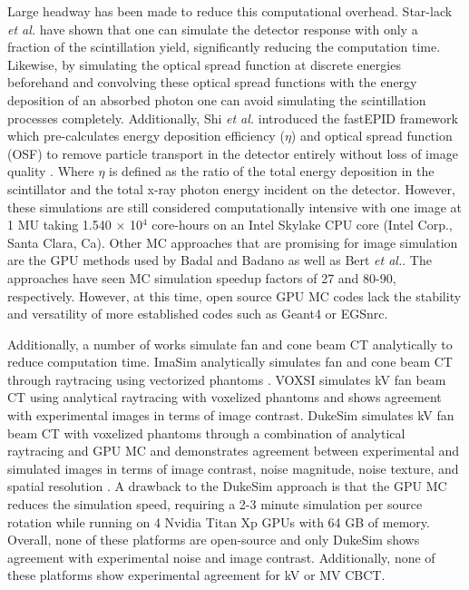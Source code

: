 Large headway has been made to reduce this computational overhead. Star-lack \textit{et al.}  have shown that one can simulate the detector response with only a fraction of the scintillation yield, significantly reducing the computation time\cite{Star-Lack2014RapidDQEf}. Likewise, by simulating the optical spread function at discrete energies beforehand and convolving these optical spread functions with the energy deposition of an absorbed photon one can avoid simulating the scintillation processes completely\cite{Kausch1999MonteRadiotherapy, Kirkby2005ComprehensiveEPID}. Additionally, Shi \textit{et al.} introduced the fastEPID framework which pre-calculates energy deposition efficiency ($\eta$) and optical spread function (OSF) to remove particle transport in the detector entirely without loss of image quality \cite{Shi2019ADetectors.}. Where $\eta$ is defined as the ratio of the total energy deposition in the scintillator and the total x-ray photon energy incident on the detector. However, these simulations are still considered computationally intensive with one image at 1 MU taking 1.540 $\times$ 10$^4$ core-hours on an Intel Skylake CPU core (Intel Corp., Santa Clara, Ca). Other MC approaches that are promising for image simulation are the GPU methods used by Badal and Badano as well as Bert \textit{et al.}\cite{Bert2013Geant4-basedApplications,Badal2009AcceleratingUnit}. The approaches have seen MC simulation speedup factors of 27 and 80-90, respectively. However, at this time, open source GPU MC codes lack the stability and versatility of more established codes such as Geant4 or EGSnrc.

Additionally, a number of works simulate fan and cone beam CT analytically to reduce computation time. ImaSim analytically simulates fan and cone beam CT through raytracing using vectorized phantoms \cite{Landry2013ImaSimRadiology}. VOXSI simulates kV fan beam CT using analytical raytracing with voxelized phantoms \cite{vanderHeyden2018VOXSI:Imaging} and shows agreement with experimental images in terms of image contrast. DukeSim simulates kV fan beam CT with voxelized phantoms through a combination of analytical raytracing and GPU MC and demonstrates agreement between experimental and simulated images in terms of image contrast, noise magnitude, noise texture, and spatial resolution \cite{Abadi2019DukeSim:Tomography}. A drawback to the DukeSim approach is that the GPU MC reduces the simulation speed, requiring a 2-3 minute simulation per source rotation while running on 4 Nvidia Titan Xp GPUs with 64 GB of memory. Overall, none of these platforms are open-source and only DukeSim shows agreement with experimental noise and image contrast. Additionally, none of these platforms show experimental agreement for kV or MV CBCT.

